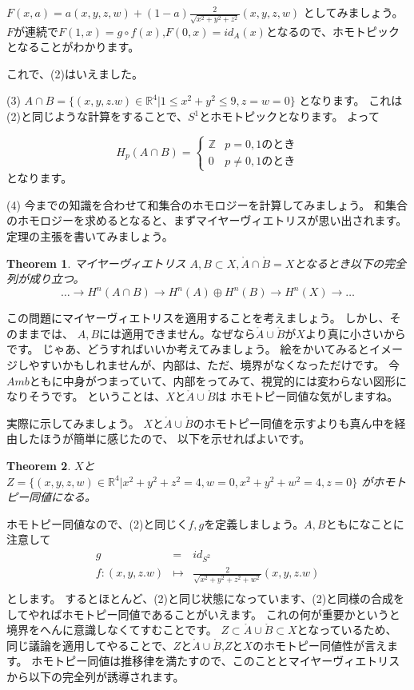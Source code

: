 \documentclass{ujarticle}
\newtheorem{thm}{Theorem}[section]
\begin{document}
$F(x ,a) =a(x,y,z,w)+(1-a)\frac{2}{\sqrt{x^2 + y^2 + z^2}}(x,y,z,w)$
としてみましょう。
$F$が連続で$F(1,x)=g \circ f (x)$,$F(0,x) = id_A(x)$となるので、ホモトピックとなることがわかります。

これで、(2)はいえました。

(3)
$A \cap B = \{ (x,y,z.w) \in \mathbb{R}^4 |  1 \le x^2 + y^2  \le 9 ,z=w =0 \}$
となります。
これは(2)と同じような計算をすることで、$S^1$とホモトピックとなります。
よって

\begin{equation*}
  H_p(A \cap B ) =
  \begin{cases}
    \mathbb{Z} & \text{$p =0,1$のとき}　\\
    0  & \text{$p  \neq 0,1$のとき}
  \end{cases}
\end{equation*}
となります。

(4)
今までの知識を合わせて和集合のホモロジーを計算してみましょう。
和集合のホモロジーを求めるとなると、まずマイヤーヴィエトリスが思い出されます。
定理の主張を書いてみましょう。

\begin{thm}{マイヤーヴィエトリス}
  $A,B \subset X,\mathring{A}　\cap \mathring{B} =X $となるとき以下の完全列が成り立つ。
  \begin{equation*}
  \dots \to  H^n(A \cap B) \to H^n(A) \oplus H^n(B) \to H^n(X) \to \dots
  \end{equation*}
\end{thm}
この問題にマイヤーヴィエトリスを適用することを考えましょう。
しかし、そのままでは、
$A,B$には適用できません。なぜなら$\mathring{A} \cup \mathring{B}$が$X$より真に小さいからです。
じゃあ、どうすればいいか考えてみましょう。
絵をかいてみるとイメージしやすいかもしれませんが、内部は、ただ、境界がなくなっただけです。
今$Amb$ともに中身がつまっていて、内部をってみて、視覚的には変わらない図形になりそうです。
ということは、$X$と$\mathring{A} \cup \mathring{B}$は
ホモトピー同値な気がしますね。

実際に示してみましょう。
$X$と$\mathring{A} \cup \mathring{B}$のホモトピー同値を示すよりも真ん中を経由したほうが簡単に感じたので、
以下を示せればよいです。
\begin{thm}
$X$と$Z=\{ (x,y,z,w) \in \mathbb{R}^4 |  x^2 + y^2 + z^2 = 4 ,w =0 , x^2 +y^2 + w^2 =4,z=0   \}$
がホモトピー同値になる。
\end{thm}

ホモトピー同値なので、(2)と同じく$f,g$を定義しましょう。$A,B$ともになことに注意して
\begin{eqnarray*}
  g &=& id_{S^2}　 \\
  f :(x,y,z.w) &\mapsto& \frac{2}{\sqrt{x^2 + y^2 + z^2 +w^2}}(x,y,z.w)  \\
\end{eqnarray*}
とします。
するとほとんど、(2)と同じ状態になっています、(2)と同様の合成をしてやればホモトピー同値であることがいえます。
これの何が重要かというと境界をへんに意識しなくてすむことです。
$Z \subset \mathring{A} \cup \mathring{B} \subset X$となっているため、
同じ議論を適用してやることで、$Z$と$\mathring{A} \cup \mathring{B} $,$Z$と$X$のホモトピー同値性が言えます。
ホモトピー同値は推移律を満たすので、このこととマイヤーヴィエトリスから以下の完全列が誘導されます。
\end{document}
